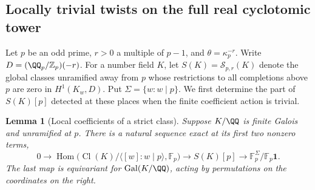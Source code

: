 \documentclass[a4paper,11pt]{article}
\newtheorem{lemma}[proposition]{Lemma}
\theoremstyle{definition}
\theoremstyle{remark}
\newcommand{\ZZ}{\mathbb Z}\newcommand{\ord}{\operatorname{ord}}
\numberwithin{equation}{section}
\newcommand{\Cl}{\operatorname{Cl}}
\begin{document}
\subsection{Locally trivial twists on the full real cyclotomic tower}\label{nav:III-18}
\label{sec:tower138}

Let \(p\) be an odd prime, \(r>0\) a multiple of \(p-1\), and
\(\theta=\kappa_p^{-r}\). Write \(D=(\QQ_p/\ZZ_p)(-r)\).
For a number field \(K\), let \(S(K)=\mathcal S_{p,r}(K)\)
denote the global classes unramified away from \(p\) whose
restrictions to all completions above \(p\) are zero in
\(H^1(K_w,D)\). Put \(\Sigma=\{w:w\mid p\}\).
We first determine the part of \(S(K)[p]\) detected at these
places when the finite coefficient action is trivial.

\begin{lemma}[Local coefficients of a strict class]\label{lem:slope138}
Suppose \(K/\QQ\) is finite Galois and unramified at \(p\).
There is a natural sequence exact at its first two nonzero terms,
\begin{equation}
  0\longrightarrow
  \operatorname{Hom}\bigl(\Cl(K)/\langle[w]:w\mid p\rangle,
                              \mathbb F_p\bigr)
  \longrightarrow S(K)[p]\longrightarrow
                   \mathbb F_p^\Sigma/\mathbb F_p\mathbf 1 .
  \label{eq:slope138}
\end{equation}
The last map is equivariant for \(\operatorname{Gal}(K/\QQ)\),
acting by permutations on the coordinates on the right.
\end{lemma}
\end{document}
